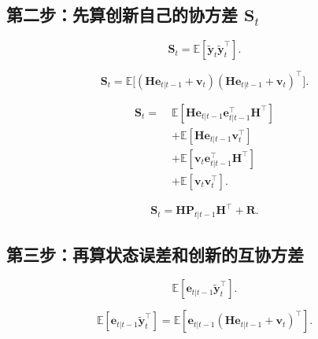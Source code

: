 \subsection{第二步：先算创新自己的协方差 \texorpdfstring{$\bm{S}_t$}{S_t}}


\[
\bm{S}_t
= \mathbb{E}[\tilde{\bm{y}}_t\tilde{\bm{y}}_t^\top].
\]


\[
\bm{S}_t
= \mathbb{E}\bigl[(\bm{H}\bm{e}_{t|t-1}+\bm{v}_t)(\bm{H}\bm{e}_{t|t-1}+\bm{v}_t)^\top\bigr].
\]


\[
\begin{aligned}
\bm{S}_t
=\;&
\mathbb{E}[\bm{H}\bm{e}_{t|t-1}\bm{e}_{t|t-1}^\top\bm{H}^\top] \\
&+ \mathbb{E}[\bm{H}\bm{e}_{t|t-1}\bm{v}_t^\top] \\
&+ \mathbb{E}[\bm{v}_t\bm{e}_{t|t-1}^\top\bm{H}^\top] \\
&+ \mathbb{E}[\bm{v}_t\bm{v}_t^\top].
\end{aligned}
\]



\[
\bm{S}_t
= \bm{H}\bm{P}_{t|t-1}\bm{H}^\top + \bm{R}.
\]


\subsection{第三步：再算状态误差和创新的互协方差}


\[
\mathbb{E}[\bm{e}_{t|t-1}\tilde{\bm{y}}_t^\top].
\]


\[
\mathbb{E}[\bm{e}_{t|t-1}\tilde{\bm{y}}_t^\top]
= \mathbb{E}[\bm{e}_{t|t-1}(\bm{H}\bm{e}_{t|t-1}+\bm{v}_t)^\top].
\]

